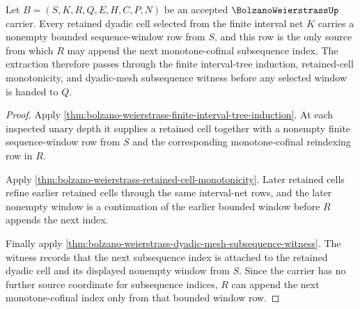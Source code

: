 \begin{theorem}
\label{thm:bolzano-weierstrass-bounded-window-nonempty-extraction}
Let $B=(S,K,R,Q,E,H,C,P,N)$ be an accepted $\BolzanoWeierstrassUp$ carrier. Every retained dyadic cell selected from the finite interval net $K$ carries a nonempty bounded sequence-window row from $S$, and this row is the only source from which $R$ may append the next monotone-cofinal subsequence index. The extraction therefore passes through the finite interval-tree induction, retained-cell monotonicity, and dyadic-mesh subsequence witness before any selected window is handed to $Q$.
\end{theorem}
\begin{proof}
Apply \autoref{thm:bolzano-weierstrass-finite-interval-tree-induction}. At each inspected unary depth it supplies a retained cell together with a nonempty finite sequence-window row from $S$ and the corresponding monotone-cofinal reindexing row in $R$.

Apply \autoref{thm:bolzano-weierstrass-retained-cell-monotonicity}. Later retained cells refine earlier retained cells through the same interval-net rows, and the later nonempty window is a continuation of the earlier bounded window before $R$ appends the next index.

Finally apply \autoref{thm:bolzano-weierstrass-dyadic-mesh-subsequence-witness}. The witness records that the next subsequence index is attached to the retained dyadic cell and its displayed nonempty window from $S$. Since the carrier has no further source coordinate for subsequence indices, $R$ can append the next monotone-cofinal index only from that bounded window row.
\end{proof}

